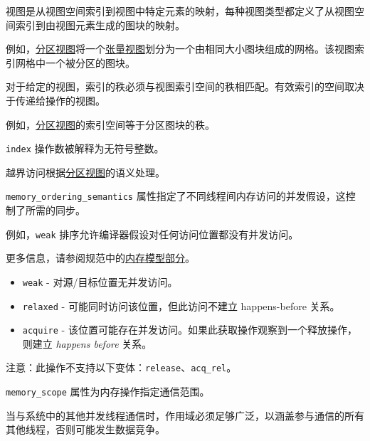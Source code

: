 \documentclass{article}
\begin{document}
视图是从视图空间索引到视图中特定元素的映射，每种视图类型都定义了从视图空间索引到由视图元素生成的图块的映射。



例如，\href{https://docs.nvidia.com/cuda/tile-ir/latest/sections/types.html#type-partition-view}{分区视图}将一个\href{https://docs.nvidia.com/cuda/tile-ir/latest/sections/types.html#type-tensor-view}{张量视图}划分为一个由相同大小图块组成的网格。该视图索引网格中一个被分区的图块。



对于给定的视图，索引的秩必须与视图索引空间的秩相匹配。有效索引的空间取决于传递给操作的视图。

例如，\href{https://docs.nvidia.com/cuda/tile-ir/latest/sections/types.html#type-partition-view}{分区视图}的索引空间等于分区图块的秩。



\texttt{index} 操作数被解释为无符号整数。



越界访问根据\href{https://docs.nvidia.com/cuda/tile-ir/latest/sections/types.html#type-partition-view}{分区视图}的语义处理。



\texttt{memory\_ordering\_semantics} 属性指定了不同线程间内存访问的并发假设，这控制了所需的同步。

例如，\texttt{weak} 排序允许编译器假设对任何访问位置都没有并发访问。

更多信息，请参阅规范中的\href{https://docs.nvidia.com/cuda/tile-ir/latest/sections/memory_model.html#section-memory-model}{内存模型部分}。



\begin{itemize}
\item \texttt{weak} - 对源/目标位置无并发访问。
\item \texttt{relaxed} - 可能同时访问该位置，但此访问不建立 happens-before 关系。
\item \texttt{acquire} - 该位置可能存在并发访问。如果此获取操作观察到一个释放操作，则建立 \textit{happens before} 关系。


\end{itemize}
注意：此操作不支持以下变体：\texttt{release}、\texttt{acq\_rel}。



\texttt{memory\_scope} 属性为内存操作指定通信范围。

当与系统中的其他并发线程通信时，作用域必须足够广泛，以涵盖参与通信的所有其他线程，否则可能发生数据竞争。
\end{document}
